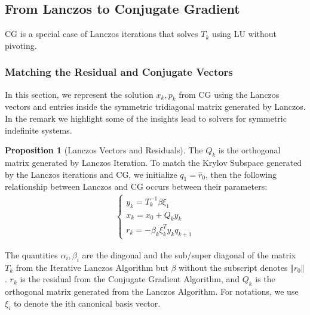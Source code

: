 \documentclass[]{article}
\theoremstyle{definition}
\newtheorem{prop}{Proposition}[section]  %
\begin{document}
    \subsection{From Lanczos to Conjugate Gradient}
            CG is a special case of Lanczos iterations that solves $T_k$ using LU without pivoting. 
        \subsubsection{Matching the Residual and Conjugate Vectors}
            In this section, we represent the solution $x_k, p_k$ from CG using the Lanczos vectors and entries inside the symmetric tridiagonal matrix generated by Lanczos. In the remark we highlight some of the insights lead to solvers for symmetric indefinite systems. 
            \begin{prop}[Lanczos Vectors and Residuals]\label{prop:Lanczos_Vectors_and_Residuals}
                The $Q_k$ is the orthogonal matrix generated by Lanczos Iteration. To match the Krylov Subspace generated by the Lanczos iterations and CG, we initialize $q_1 = \hat{r}_0$, then the following relationship between Lanczos and CG occurs between their parameters: 
                \begin{align}
                    \begin{cases}
                        y_k = T^{-1}_k \beta\xi_1
                        \\
                        x_k = x_0 + Q_k y_k
                        \\
                        r_k = -\beta_{k}\xi_k^T y_k q_{k +1}
                    \end{cases}
                \end{align}
            \end{prop}
            The quantities $\alpha_i, \beta_i$ are the diagonal and the sub/super diagonal of the matrix $T_k$ from the Iterative Lanczos Algorithm but $\beta$ without the subscript denotes $\Vert r_0\Vert$. $r_k$ is the residual from the Conjugate Gradient Algorithm, and $Q_k$ is the orthogonal matrix generated from the Lanczos Algorithm. For notations, we use $\xi_i$ to denote the ith canonical basis vector. 
\end{document}
